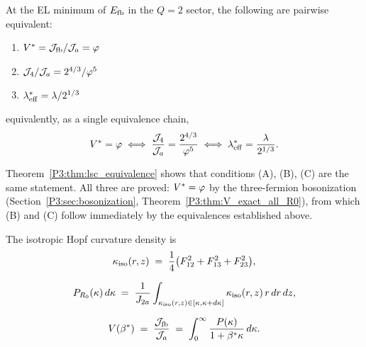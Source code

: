 \begin{theorem}
\label{P3:thm:lsc_equivalence}
At the EL minimum of $E_{\mathrm{fb}}$ in the $Q=2$ sector, the following are
pairwise equivalent:
\begin{enumerate}
  \item[(A)] $V^* = \mathcal{J}_{\mathrm{fb}}/\mathcal{J}_a = \varphi$
  \item[(B)] $\mathcal{J}_4/\mathcal{J}_a = 2^{4/3}/\varphi^5$
  \item[(C)] $\lambda_{\mathrm{eff}}^* = \lambda/2^{1/3}$
\end{enumerate}
equivalently, as a single equivalence chain,
\begin{equation}
  V^* = \varphi
  \;\Longleftrightarrow\;
  \frac{\mathcal{J}_4}{\mathcal{J}_a} = \frac{2^{4/3}}{\varphi^5}
  \;\Longleftrightarrow\;
  \lambda_{\mathrm{eff}}^* = \frac{\lambda}{2^{1/3}}.
  \label{P3:eq:equiv_chain}
\end{equation}
\end{theorem}

\begin{remark}
\label{P3:rem:all_three_proved}
Theorem~\ref{P3:thm:lsc_equivalence} shows that conditions (A), (B), (C) are
the same statement.  All three are proved: $V^*=\varphi$ by the
three-fermion bosonization (Section~\ref{P3:sec:bosonization},
Theorem~\ref{P3:thm:V_exact_all_R0}), from which (B) and (C) follow
immediately by the equivalences established above.
\end{remark}

The isotropic Hopf curvature density is
\begin{equation}
  \kappa_{\mathrm{iso}}(r,z)
  \;=\; \frac{1}{4}\bigl(F_{12}^2 + F_{13}^2 + F_{23}^2\bigr),
  \label{P3:eq:kappa_def}
\end{equation}

\begin{equation}
  P_{R_0}(\kappa)\,d\kappa
  \;=\; \frac{1}{J_{2a}}\int_{\kappa_{\mathrm{iso}}(r,z)\in[\kappa,\kappa+d\kappa]}
        \kappa_{\mathrm{iso}}(r,z)\,r\,dr\,dz,
  \label{P3:eq:Pkappa_def}
\end{equation}

\begin{equation}
  V(\beta^{*}) \;=\; \frac{\mathcal{J}_{\mathrm{fb}}}{\mathcal{J}_a} \;=\; \int_0^\infty \frac{P(\kappa)}{1+\beta^{*}\kappa}\,d\kappa.
  \label{P3:eq:V_integral}
\end{equation}

